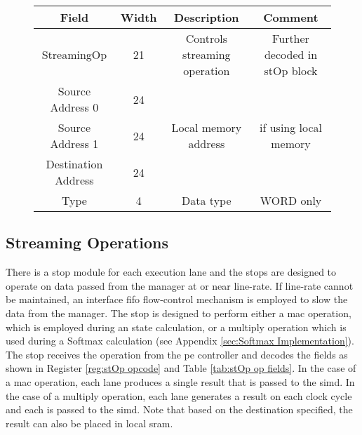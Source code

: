 \begin{figure}[h]
\begin{minipage}{1\textwidth}
\begin{minipage}{1\textwidth}
\begin{minipage}[t]{0.75\textwidth}
\begin{adjustbox}{width=1\textwidth}
\begin{tabular}{ |c|c|c|c|  }
              Field & Width & Description & Comment \\
              \hline
              StreamingOp         & 21 & Controls streaming operation          & Further decoded in stOp block          \\\cline{1-4}
              Source Address 0    & 24 & \multirow{3}{*}{Local memory address} & \multirow{3}{*}{if using local memory} \\\cline{1-2}
              Source Address 1    & 24 &                                       &                                        \\\cline{1-2}
              Destination Address & 24 &                                       &                                        \\\cline{1-4}
              Type                & 4  & Data type                             & WORD only                              \\\cline{1-4}
              \hline
            \end{tabular}
        \end{adjustbox}
      \end{minipage}
    \end{minipage}
    \label{tab:stOp pointer memory}
  \end{minipage}
\end{figure}


\subsection{Streaming Operations}
\label{sec:stOps}

There is a \ac{stop} module for each execution lane and the \acp{stop} are designed to operate on data passed from the manager at or near line-rate. 
If line-rate cannot be maintained, an interface \ac{fifo} flow-control mechanism is employed to slow the data from the manager.
The \ac{stop} is designed to perform either a \ac{mac} operation, which is employed during \ac{an} state calculation, or a multiply operation which is used during a Softmax \cite{wikipedia_softmax} calculation (see Appendix \ref{sec:Softmax Implementation}).
The \ac{stop} receives the operation from the \ac{pe} controller and decodes the fields as shown in Register \ref{reg:stOp opcode} and Table \ref{tab:stOp op fields}.
In the case of a \ac{mac} operation, each lane produces a single result that is passed to the \ac{simd}.
In the case of a multiply operation, each lane generates a result on each clock cycle and each is passed to the \ac{simd}.
Note that based on the destination specified, the result can also be placed in local \ac{sram}.

